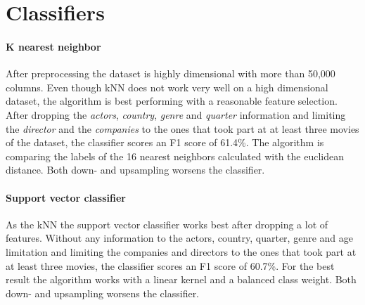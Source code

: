 \section {Classifiers}
\paragraph{K nearest neighbor}
After preprocessing the dataset is highly dimensional with more than 50,000 columns. Even though kNN does not work very well on a high dimensional dataset, the algorithm is best performing with a reasonable feature selection. After dropping the \textit{actors}, \textit{country}, \textit{genre} and \textit{quarter} information and limiting the \textit{director} and the \textit{companies} to the ones that took part at at least three movies of the dataset, the classifier scores an F1 score of 61.4\%. The algorithm is comparing the labels of the 16 nearest neighbors calculated with the euclidean distance. Both down- and upsampling worsens the classifier. 

\paragraph{Support vector classifier}
As the kNN the support vector classifier works best after dropping a lot of features. Without any information to the actors, country, quarter, genre and age limitation and limiting the companies and directors to the ones that took part at at least three movies, the classifier scores an F1 score of 60.7\%. For the best result the algorithm works with a linear kernel and a balanced class weight. Both down- and upsampling worsens the classifier.


